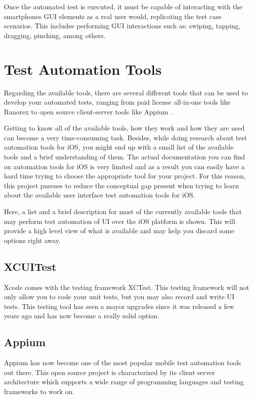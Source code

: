 Once the automated test is executed, it must be capable of interacting with the smartphones GUI elements as a real user would, replicating the test case scenarios. This includes performing GUI interactions such as: swiping, tapping, dragging, pinching, among others.

\section{Test Automation Tools}

Regarding the available tools, there are several different tools that can be used to develop your automated tests, ranging from paid license all-in-one tools like Ranorex \cite{Ranorex} to open source client-server tools like Appium \cite{Appium}. 

Getting to know all of the available tools, how they work and how they are used can become a very time-consuming task. Besides, while doing research about test automation tools for iOS, you might end up with a small list of the available tools and a brief understanding of them. The actual documentation you can find on automation tools for iOS is very limited and as a result you can easily have a hard time trying to choose the appropriate tool for your project. For this reason, this project pursues to reduce the conceptual gap present when trying to learn about the available user interface test automation tools for iOS.

Here, a list and a brief description for most of the currently available tools that may perform test automation of UI over the iOS platform is shown. This will provide a high level view of what is available and may help you discard some options right away.

\subsection {XCUITest}
Xcode comes with the testing framework XCTest. This testing framework will not only allow you to code your unit tests, but you may also record and write UI tests. This testing tool has seen a mayor upgrades since it was released a few years ago and has now become a really solid option. \cite{XCUITest}

\subsection {Appium}
Appium has now become one of the most popular mobile test automation tools out there. This open source project is characterized by its client server architecture which supports a wide range of programming languages and testing frameworks to work on. \cite{Appium}

